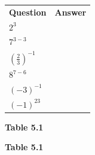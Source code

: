           \begin{table}
        \begin{center}
      \label{m38359*id67604}
    \noindent
      \tablelasttail{}
      \begin{xtabular}[t]{|l|l|}\hline
                  \textbf{Question}
                 &
                  \textbf{Answer}
     \tabularnewline{}
                  ${2}^{3}$
                 &
     \tabularnewline{}
                  ${7}^{3-3}$
                 &
     \tabularnewline{}
                  ${\left(\frac{2}{3}\right)}^{-1}$
                 &
     \tabularnewline{}
                  ${8}^{7-6}$
                 &
     \tabularnewline{}
                  ${\left(-3\right)}^{-1}$
                 &
     \tabularnewline{}
                  ${\left(-1\right)}^{23}$
                 &
     \tabularnewline{}
    \end{xtabular}
      \end{center}
    \begin{center}{\small\bfseries Table 5.1}\end{center}
    \begin{caption}{\small\bfseries Table 5.1}\end{caption}
\end{table}
    \par
